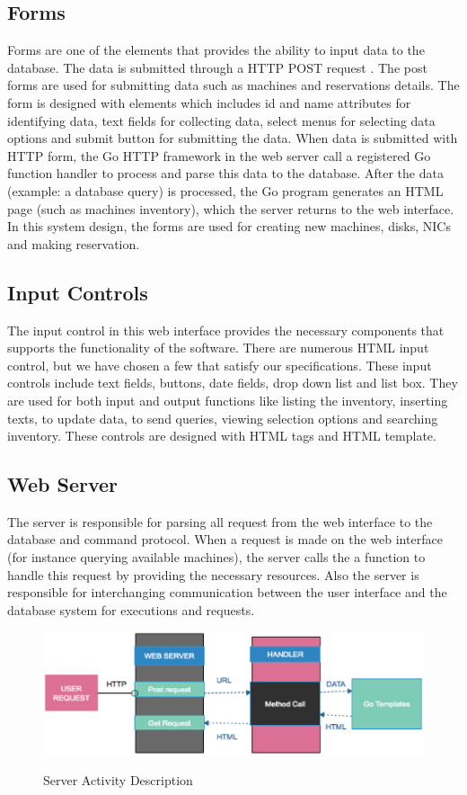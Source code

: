 \subsection*{Forms}
Forms are one  of the elements that provides the ability to input data to the database. The data is submitted through a HTTP POST request \cite{WinNT}. The post forms are used for submitting data such as machines and reservations details. The form is designed with elements which includes id and name attributes for identifying data, text fields for collecting data, select menus for selecting data options and submit button for submitting the data. When data is submitted with HTTP form, the Go HTTP framework in the web server call a registered Go function handler to process and parse this data to the database.  After the data (example: a database query) is processed, the Go program generates an HTML page (such as machines inventory), which the server returns to the web interface. In this system design, the forms are used for creating new machines, disks, NICs and making reservation. 
\subsection*{Input Controls}
The input control in this web interface provides the necessary components that supports the functionality of the software. There are numerous HTML input control, but we have chosen a few that satisfy our specifications. These input controls include text fields, buttons, date fields, drop down list and list box. They are used for both input and output functions like listing the inventory, inserting texts, to update data, to send queries, viewing selection options and searching inventory. These controls are designed with HTML tags and HTML template.
\subsection{Web Server}
The server is responsible for parsing all request from the web interface to the database and command protocol. When a request is made on the web interface (for instance querying available machines), the server calls the a function to handle this request by providing the necessary resources. Also the server is responsible for interchanging communication between the user interface and the database system for executions and requests. 
\begin{figure}[h!]
\includegraphics[width = \linewidth]{server1.eps}
\label{fig:Description of Server Activity} 
\caption{Server Activity Description}
\end{figure}


